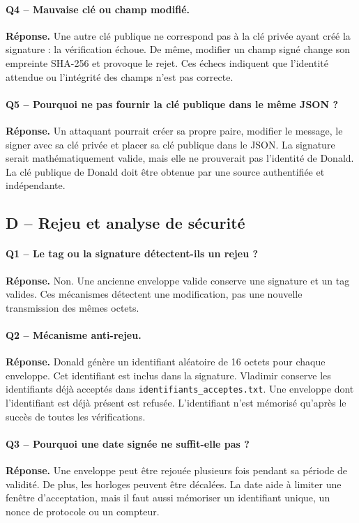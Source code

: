 \documentclass[11pt,a4paper]{article}
\newcommand{\fichier}[1]{\texttt{#1}}
\newcommand{\reponse}{\textbf{Réponse.} }
\begin{document}
\paragraph{Q4 -- Mauvaise clé ou champ modifié.}
\reponse Une autre clé publique ne correspond pas à la clé privée ayant créé la
signature : la vérification échoue. De même, modifier un champ signé change son
empreinte SHA-256 et provoque le rejet. Ces échecs indiquent que l'identité attendue ou
l'intégrité des champs n'est pas correcte.

\paragraph{Q5 -- Pourquoi ne pas fournir la clé publique dans le même JSON ?}
\reponse Un attaquant pourrait créer sa propre paire, modifier le message, le signer
avec sa clé privée et placer sa clé publique dans le JSON. La signature serait
mathématiquement valide, mais elle ne prouverait pas l'identité de Donald. La clé
publique de Donald doit être obtenue par une source authentifiée et indépendante.

\subsection{D -- Rejeu et analyse de sécurité}

\paragraph{Q1 -- Le tag ou la signature détectent-ils un rejeu ?}
\reponse Non. Une ancienne enveloppe valide conserve une signature et un tag valides.
Ces mécanismes détectent une modification, pas une nouvelle transmission des mêmes
octets.

\paragraph{Q2 -- Mécanisme anti-rejeu.}
\reponse Donald génère un identifiant aléatoire de 16 octets pour chaque enveloppe.
Cet identifiant est inclus dans la signature. Vladimir conserve les identifiants déjà
acceptés dans \fichier{identifiants\_acceptes.txt}. Une enveloppe dont l'identifiant est
déjà présent est refusée. L'identifiant n'est mémorisé qu'après le succès de toutes les
vérifications.

\paragraph{Q3 -- Pourquoi une date signée ne suffit-elle pas ?}
\reponse Une enveloppe peut être rejouée plusieurs fois pendant sa période de validité.
De plus, les horloges peuvent être décalées. La date aide à limiter une fenêtre
d'acceptation, mais il faut aussi mémoriser un identifiant unique, un nonce de protocole
ou un compteur.
\end{document}
